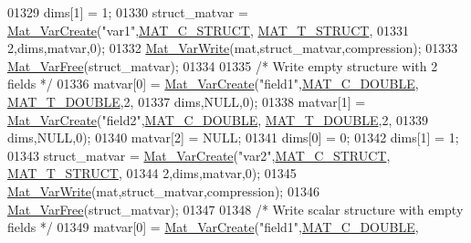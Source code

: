\begin{DoxyCode}
{{{{01329         dims[1] = 1;
01330         struct\_matvar = \hyperlink{group___m_a_t_ga1c54a84bb4d810c6fccdb8869489eac4}{Mat\_VarCreate}(\textcolor{stringliteral}{"var1"},\hyperlink{group___m_a_t_ggad4d60ae7b709fc81bfd744fb4c857c40acb467c7749c80902b798134c729bb521}{MAT\_C\_STRUCT},
      \hyperlink{group___m_a_t_ggacf7b3b879282b7ab3a51190e49bf3453a4f4d5a6e1d42c6aa81ffb810e5da5c85}{MAT\_T\_STRUCT},
01331                                       2,dims,matvar,0);
01332         \hyperlink{group___m_a_t_ga4bd3eba12df415d8226e27c457fbbb0b}{Mat\_VarWrite}(mat,struct\_matvar,compression);
01333         \hyperlink{group___m_a_t_ga1d14716f7450530fd1c9d02413787f0e}{Mat\_VarFree}(struct\_matvar);
01334 
01335         \textcolor{comment}{/* Write empty structure with 2 fields */}
01336         matvar[0] = \hyperlink{group___m_a_t_ga1c54a84bb4d810c6fccdb8869489eac4}{Mat\_VarCreate}(\textcolor{stringliteral}{"field1"},\hyperlink{group___m_a_t_ggad4d60ae7b709fc81bfd744fb4c857c40a5d70e0862e5bdb7bd86bf7ba5948f307}{MAT\_C\_DOUBLE},
      \hyperlink{group___m_a_t_ggacf7b3b879282b7ab3a51190e49bf3453a31e721ecf7e188196f83c32838288797}{MAT\_T\_DOUBLE},2,
01337                        dims,NULL,0);
01338         matvar[1] = \hyperlink{group___m_a_t_ga1c54a84bb4d810c6fccdb8869489eac4}{Mat\_VarCreate}(\textcolor{stringliteral}{"field2"},\hyperlink{group___m_a_t_ggad4d60ae7b709fc81bfd744fb4c857c40a5d70e0862e5bdb7bd86bf7ba5948f307}{MAT\_C\_DOUBLE},
      \hyperlink{group___m_a_t_ggacf7b3b879282b7ab3a51190e49bf3453a31e721ecf7e188196f83c32838288797}{MAT\_T\_DOUBLE},2,
01339                        dims,NULL,0);
01340         matvar[2] = NULL;
01341         dims[0] = 0;
01342         dims[1] = 1;
01343         struct\_matvar = \hyperlink{group___m_a_t_ga1c54a84bb4d810c6fccdb8869489eac4}{Mat\_VarCreate}(\textcolor{stringliteral}{"var2"},\hyperlink{group___m_a_t_ggad4d60ae7b709fc81bfd744fb4c857c40acb467c7749c80902b798134c729bb521}{MAT\_C\_STRUCT},
      \hyperlink{group___m_a_t_ggacf7b3b879282b7ab3a51190e49bf3453a4f4d5a6e1d42c6aa81ffb810e5da5c85}{MAT\_T\_STRUCT},
01344                                       2,dims,matvar,0);
01345         \hyperlink{group___m_a_t_ga4bd3eba12df415d8226e27c457fbbb0b}{Mat\_VarWrite}(mat,struct\_matvar,compression);
01346         \hyperlink{group___m_a_t_ga1d14716f7450530fd1c9d02413787f0e}{Mat\_VarFree}(struct\_matvar);
01347 
01348         \textcolor{comment}{/* Write scalar structure with empty fields */}
01349         matvar[0] = \hyperlink{group___m_a_t_ga1c54a84bb4d810c6fccdb8869489eac4}{Mat\_VarCreate}(\textcolor{stringliteral}{"field1"},\hyperlink{group___m_a_t_ggad4d60ae7b709fc81bfd744fb4c857c40a5d70e0862e5bdb7bd86bf7ba5948f307}{MAT\_C\_DOUBLE},
}}}}
\end{DoxyCode}
